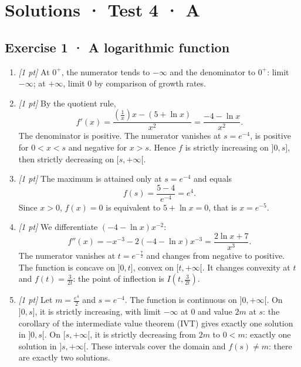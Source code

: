 \ifmxteacher\mxnewpage

\section*{Solutions · Test 4 · A}\label{cor:6-3}

\subsection*{Exercise 1 · A logarithmic function}\begin{enumerate}

\item \textit{[1 pt]} At $0^+$, the numerator tends to $-\infty$ and the denominator to $0^+$: limit $-\infty$; at $+\infty$, limit $0$ by comparison of growth rates.

\item \textit{[1 pt]} By the quotient rule,
\[f'(x)=\frac{(\frac{1}{x})x-(5+\ln x)}{x^2}=\frac{-4-\ln x}{x^2}.\]
The denominator is positive. The numerator vanishes at $s=e^{-4}$, is positive for $0<x<s$ and negative for $x>s$. Hence $f$ is strictly increasing on $]0,s]$, then strictly decreasing on $[s,+\infty[$.

\item \textit{[1 pt]} The maximum is attained only at $s=e^{-4}$ and equals
\[f(s)=\frac{5- 4}{e^{-4}}=e^{4}.\]
Since $x>0$, $f(x)=0$ is equivalent to $5+\ln x=0$, that is $x=e^{-5}$.

\item \textit{[1 pt]} We differentiate $(-4-\ln x)x^{-2}$:
\[f''(x)=-x^{-3}-2(-4-\ln x)x^{-3}=\frac{2\ln x+7}{x^3}.\]
The numerator vanishes at $t=e^{-\frac{7}{2}}$ and changes from negative to positive. The function is concave on $]0,t]$, convex on $[t,+\infty[$. It changes convexity at $t$ and $f(t)=\frac{3}{2t}$: the point of inflection is $I(t,\frac{3}{2t})$.

\item \textit{[1 pt]} Let $m=\frac{e^{4}}{2}$ and $s=e^{-4}$. The function is continuous on $]0,+\infty[$. On $]0,s]$, it is strictly increasing, with limit $-\infty$ at $0$ and value $2m$ at $s$: the corollary of the intermediate value theorem (IVT) gives exactly one solution in $]0,s[$. On $[s,+\infty[$, it is strictly decreasing from $2m$ to $0<m$: exactly one solution in $]s,+\infty[$. These intervals cover the domain and $f(s)\ne m$: there are exactly two solutions.

\end{enumerate}

